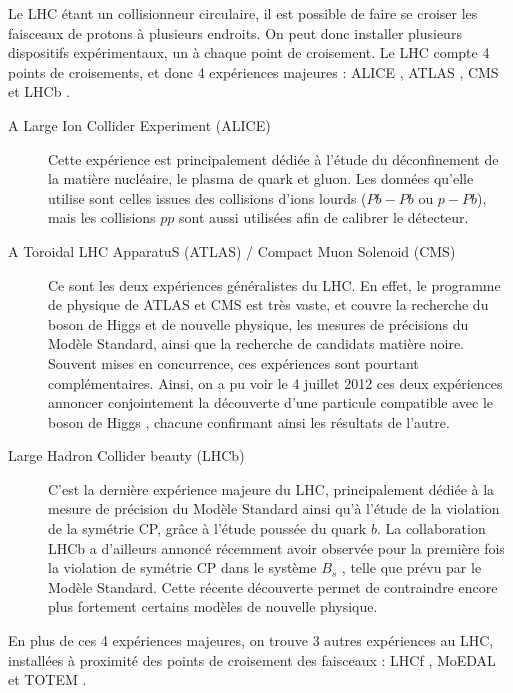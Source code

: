 Le LHC étant un collisionneur circulaire, il est possible de faire se croiser les faisceaux de protons à plusieurs endroits. On peut donc installer plusieurs dispositifs expérimentaux, un à chaque point de croisement. Le LHC compte 4 points de croisements, et donc 4 expériences majeures : ALICE \citep{alice}, ATLAS \citep{atlas}, CMS \citep{cms} et LHCb \citep{lhcb}.

\begin{description}
  \item[A Large Ion Collider Experiment (ALICE)] Cette expérience est principalement dédiée à l'étude du déconfinement de la matière nucléaire, le plasma de quark et gluon. Les données qu'elle utilise sont celles issues des collisions d'ions lourds ($Pb-Pb$ ou $p-Pb$), mais les collisions $pp$ sont aussi utilisées afin de calibrer le détecteur.
  \item[A Toroidal LHC ApparatuS (ATLAS) / Compact Muon Solenoid (CMS)] Ce sont les deux expériences généralistes du LHC. En effet, le programme de physique de ATLAS et CMS est très vaste, et couvre la recherche du boson de Higgs et de nouvelle physique, les mesures de précisions du Modèle Standard, ainsi que la recherche de candidats matière noire. Souvent mises en concurrence, ces expériences sont pourtant complémentaires. Ainsi, on a pu voir le 4 juillet 2012 ces deux expériences annoncer conjointement la découverte d'une particule compatible avec le boson de Higgs \citep{higgs_atlas,higgs_cms}, chacune confirmant ainsi les résultats de l'autre.
  \item[Large Hadron Collider beauty (LHCb)] C'est la dernière expérience majeure du LHC, principalement dédiée à la mesure de précision du Modèle Standard ainsi qu'à l'étude de la violation de la symétrie CP, grâce à l'étude poussée du quark $b$. La collaboration LHCb a d'ailleurs annoncé récemment avoir observée pour la première fois la violation de symétrie CP dans le système $B_s$ \citep{lhcb_bs}, telle que prévu par le Modèle Standard. Cette récente découverte permet de contraindre encore plus fortement certains modèles de nouvelle physique.
\end{description}

En plus de ces 4 expériences majeures, on trouve 3 autres expériences au LHC, installées à proximité des points de croisement des faisceaux : LHCf \citep{lhcf}, MoEDAL \citep{moedal} et TOTEM \citep{totem}.

